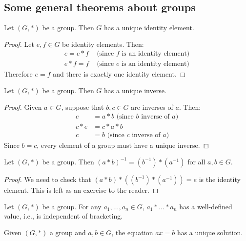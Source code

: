 \documentclass{article}
\theoremstyle{plain}
\begin{document}
\subsection{Some general theorems about groups}
\begin{lemma}{}{}
Let $(G, *)$ be a group. Then $G$ has a unique identity element.
\end{lemma}
\begin{proof}
Let $e,f \in G$ be identity elements. Then:
\begin{align*}
e = e*f &\text{ (since $f$ is an identity element)} \\
e*f = f &\text{ (since $e$ is an identity element)}
\end{align*}
Therefore $e=f$ and there is exactly one identity element.
\end{proof}
\begin{lemma}{}{}
Let $(G, *)$ be a group. Then $G$ has a unique inverse.
\end{lemma}
\begin{proof}
Given $a \in G$, suppose that $b,c \in G$ are inverses of $a$. Then:
\begin{align*}
e &= a*b \text{ (since $b$ inverse of $a$)} \\
c*e &= c*a*b \\
c &= b \text{ (since $c$ inverse of $a$)}
\end{align*}
Since $b=c$, every element of a group must have a unique inverse.
\end{proof}
\begin{lemma}{}{}
Let $(G, *)$ be a group. Then $(a*b)^{-1} = (b^{-1})*(a^{-1})$ for all $a,b \in G$.
\end{lemma}
\begin{proof}
We need to check that $(a*b)*((b^{-1})*(a^{-1})) = e$ is the identity element. This is left as an exercise to the reader.
\end{proof}
\begin{lemma}{}{}
Let $(G, *)$ be a group. For any $a_1,\ldots,a_n \in G$, $a_1*\dots *a_n$ has a well-defined value, i.e., is independent of bracketing.
\end{lemma}
\begin{theorem}{}{}
Given $(G, *)$ a group and $a,b \in G$, the equation $ax=b$ has a unique solution.
\end{theorem}
\end{document}
